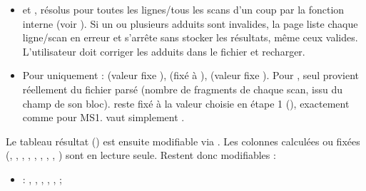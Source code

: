 \documentclass[letterpaper,10pt,english]{sphinxmanual}
\begin{document}
\begin{enumerate}
\begin{itemize}
\item {} 
\sphinxAtStartPar
{} et , résolus pour toutes les lignes/tous les
scans d’un coup par la fonction interne  (voir
{\hyperref[\detokenize{1_Integration:fonctions-internes}]{}}). Si un ou plusieurs adduits sont invalides, la
page liste chaque ligne/scan en erreur et s’arrête sans stocker les
résultats, même ceux valides. L’utilisateur doit corriger les adduits dans le fichier et recharger.

\item {} 
\sphinxAtStartPar
Pour  uniquement :  (valeur fixe ),
 (fixé à ),  (valeur fixe
). Pour , seul  provient réellement du
fichier parsé (nombre de fragments de chaque scan, issu du champ
 de son bloc).  reste fixé à la valeur
choisie en étape 1 (), exactement comme pour MS1.
 vaut simplement .

\end{itemize}

\sphinxAtStartPar
Le tableau résultat () est ensuite modifiable via
. Les colonnes calculées ou fixées (,
, , , ,
, , , ) sont en
lecture seule. Restent donc modifiables :
\begin{itemize}
\item {} 
\sphinxAtStartPar
{} : , , ,
, ,  ;


\end{itemize}
\end{enumerate}
\end{document}
